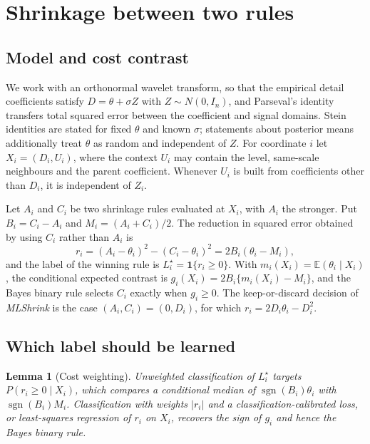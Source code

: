 \documentclass[11pt]{article}
\theoremstyle{plain}
\newtheorem{lemma}{Lemma}
\theoremstyle{definition}
\theoremstyle{remark}
\newcommand{\E}{\mathbb E}
\newcommand{\ind}{\mathbf 1}
\DeclareMathOperator{\sgn}{sgn}
\begin{document}
\section{Shrinkage between two rules}\label{sec:setting}

\subsection{Model and cost contrast}

We work with an orthonormal wavelet transform, so that the empirical detail coefficients
satisfy $D=\theta+\sigma Z$ with $Z\sim N(0,I_n)$, and Parseval's identity transfers total
squared error between the coefficient and signal domains. Stein identities are stated for
fixed $\theta$ and known $\sigma$; statements about posterior means additionally treat
$\theta$ as random and independent of $Z$. For coordinate $i$ let $X_i=(D_i,U_i)$, where
the context $U_i$ may contain the level, same-scale neighbours and the parent coefficient.
Whenever $U_i$ is built from coefficients other than $D_i$, it is independent of $Z_i$.

Let $A_i$ and $C_i$ be two shrinkage rules evaluated at $X_i$, with $A_i$ the stronger. Put
$B_i=C_i-A_i$ and $M_i=(A_i+C_i)/2$. The reduction in squared error obtained by using $C_i$
rather than $A_i$ is
\begin{equation}\label{eq:contrast}
r_i=(A_i-\theta_i)^2-(C_i-\theta_i)^2=2B_i(\theta_i-M_i),
\end{equation}
and the label of the winning rule is $L_i^\star=\ind\{r_i\ge0\}$. With
$m_i(X_i)=\E(\theta_i\mid X_i)$, the conditional expected contrast is
$g_i(X_i)=2B_i\{m_i(X_i)-M_i\}$, and the Bayes binary rule selects $C_i$ exactly when
$g_i\ge0$. The keep-or-discard decision of \emph{MLShrink} is the case $(A_i,C_i)=(0,D_i)$,
for which $r_i=2D_i\theta_i-D_i^2$.

\subsection{Which label should be learned}

\begin{lemma}[Cost weighting]\label{lem:cost}
Unweighted classification of $L_i^\star$ targets $P(r_i\ge0\mid X_i)$, which compares a
conditional median of $\sgn(B_i)\theta_i$ with $\sgn(B_i)M_i$. Classification with weights
$|r_i|$ and a classification-calibrated loss, or least-squares regression of $r_i$ on
$X_i$, recovers the sign of $g_i$ and hence the Bayes binary rule.
\end{lemma}
\end{document}
